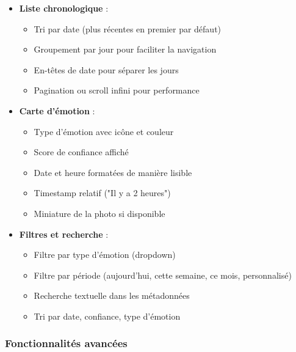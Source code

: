 \documentclass[a4paper,11pt]{report}
\begin{document}
\begin{itemize}
    \item \textbf{Liste chronologique} :
    \begin{itemize}
        \item Tri par date (plus récentes en premier par défaut)
        \item Groupement par jour pour faciliter la navigation
        \item En-têtes de date pour séparer les jours
        \item Pagination ou scroll infini pour performance
    \end{itemize}
    
    \item \textbf{Carte d'émotion} :
    \begin{itemize}
        \item Type d'émotion avec icône et couleur
        \item Score de confiance affiché
        \item Date et heure formatées de manière lisible
        \item Timestamp relatif ("Il y a 2 heures")
        \item Miniature de la photo si disponible
    \end{itemize}
    
    \item \textbf{Filtres et recherche} :
    \begin{itemize}
        \item Filtre par type d'émotion (dropdown)
        \item Filtre par période (aujourd'hui, cette semaine, ce mois, personnalisé)
        \item Recherche textuelle dans les métadonnées
        \item Tri par date, confiance, type d'émotion
    \end{itemize}
\end{itemize}

\subsubsection{Fonctionnalités avancées}
\end{document}
